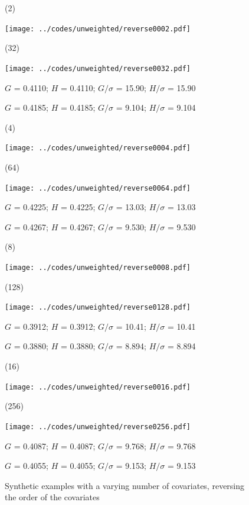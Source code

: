 \documentclass{article}
\newlength{\vertsep}
\newlength{\imsize}
\newlength{\imsized}
\begin{document}
\begin{figure}
\begin{centering}

(2) \parbox{\imsize}{\texttt{[image: ../codes/unweighted/reverse0002.pdf]}}
\quad\quad
(32) \parbox{\imsize}{\texttt{[image: ../codes/unweighted/reverse0032.pdf]}}

\parbox{\imsized}{\hfil \footnotesize $G$ = 0.4110; $H$ = 0.4110;
$G/\sigma$ = 15.90; $H/\sigma$ = 15.90}
\parbox{\imsized}{\hfil \footnotesize $G$ = 0.4185; $H$ = 0.4185;
$G/\sigma$ = 9.104; $H/\sigma$ = 9.104}

\vspace{\vertsep}

(4) \parbox{\imsize}{\texttt{[image: ../codes/unweighted/reverse0004.pdf]}}
\quad\quad
(64) \parbox{\imsize}{\texttt{[image: ../codes/unweighted/reverse0064.pdf]}}

\parbox{\imsized}{\hfil \footnotesize $G$ = 0.4225; $H$ = 0.4225;
$G/\sigma$ = 13.03; $H/\sigma$ = 13.03}
\parbox{\imsized}{\hfil \footnotesize $G$ = 0.4267; $H$ = 0.4267;
$G/\sigma$ = 9.530; $H/\sigma$ = 9.530}

\vspace{\vertsep}

(8) \parbox{\imsize}{\texttt{[image: ../codes/unweighted/reverse0008.pdf]}}
\quad\quad
(128) \parbox{\imsize}{\texttt{[image: ../codes/unweighted/reverse0128.pdf]}}

\parbox{\imsized}{\hfil \footnotesize $G$ = 0.3912; $H$ = 0.3912;
$G/\sigma$ = 10.41; $H/\sigma$ = 10.41}
\parbox{\imsized}{\hfil \footnotesize $G$ = 0.3880; $H$ = 0.3880;
$G/\sigma$ = 8.894; $H/\sigma$ = 8.894}

\vspace{\vertsep}

(16) \parbox{\imsize}{\texttt{[image: ../codes/unweighted/reverse0016.pdf]}}
\quad\quad
(256) \parbox{\imsize}{\texttt{[image: ../codes/unweighted/reverse0256.pdf]}}

\parbox{\imsized}{\hfil \footnotesize $G$ = 0.4087; $H$ = 0.4087;
$G/\sigma$ = 9.768; $H/\sigma$ = 9.768}
\parbox{\imsized}{\hfil \footnotesize $G$ = 0.4055; $H$ = 0.4055;
$G/\sigma$ = 9.153; $H/\sigma$ = 9.153}

\end{centering}
\caption{Synthetic examples with a varying number of covariates,
reversing the order of the covariates}
\label{reverse}
\end{figure}
\end{document}
